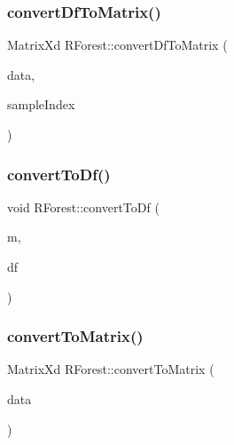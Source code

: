 \mbox{\label{classRForest_a17f0ad7b46a5bceff43411d4752002d3}} 
\subsubsection{\texorpdfstring{convert\+Df\+To\+Matrix()}{convertDfToMatrix()}}
{\footnotesize\ttfamily Matrix\+Xd R\+Forest\+::convert\+Df\+To\+Matrix (\begin{DoxyParamCaption}\item[{const doubleframe $\ast$}]{data,  }\item[{std\+::vector$<$ int $>$ \&}]{sample\+Index }\end{DoxyParamCaption})}

\mbox{\label{classRForest_a0d8c5dbc04ec8433403f40d289d28100}} 
\subsubsection{\texorpdfstring{convert\+To\+Df()}{convertToDf()}}
{\footnotesize\ttfamily void R\+Forest\+::convert\+To\+Df (\begin{DoxyParamCaption}\item[{Eigen\+::\+Matrix\+Xd \&}]{m,  }\item[{doubleframe $\ast$}]{df }\end{DoxyParamCaption})}

\mbox{\label{classRForest_ad132bc186056d96d8979fbe238afe529}} 
\subsubsection{\texorpdfstring{convert\+To\+Matrix()}{convertToMatrix()}}
{\footnotesize\ttfamily Matrix\+Xd R\+Forest\+::convert\+To\+Matrix (\begin{DoxyParamCaption}\item[{std\+::vector$<$ std\+::vector$<$ double $>$ $>$ \&}]{data }\end{DoxyParamCaption})}

